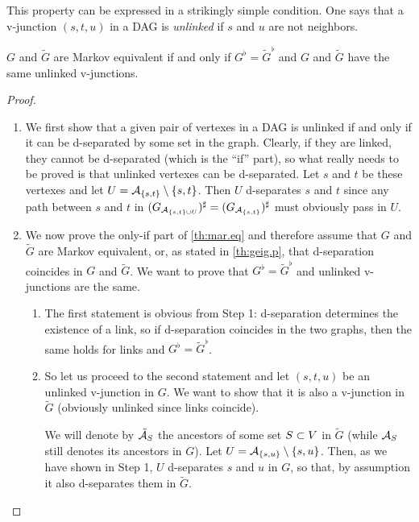 This property can be expressed in a strikingly simple
condition. One says that a v-junction $(s,t,u)$ in a DAG is {\em unlinked}
if $s$ and $u$ are not neighbors.   
\begin{theorem}
\label{th:mar.eq}
$G$ and $\tilde G$ are Markov equivalent if and only if $G^\flat =
\tilde G^\flat$ and $G$ and $\tilde G$ have the same unlinked v-junctions.
\end{theorem}
\begin{proof}

\begin{enumerate}[label={\it Step \arabic*.}]
\item
We first show that
a given pair of vertexes in a DAG is unlinked if and only if it can
be d-separated by some set in the graph. Clearly, if they are linked,
they cannot be d-separated (which is the ``if'' part), so what really needs to be proved is that
unlinked vertexes can be d-separated. Let $s$ and $t$ be these vertexes
and let $U = {\mathcal A}_{\{s,t\}}\setminus \{s,t\}$. Then $U$ d-separates $s$ and
$t$ since any path between $s$ and $t$ in $(G_{{\mathcal A}_{\{s,t\}\cup
U}})^\sharp = (G_{{\mathcal A}_{\{s,t\}}})^\sharp$ must obviously pass in $U$.

\item  We now prove the only-if part of 
\cref{th:mar.eq} and
therefore assume that $G$ and $\tilde G$ are Markov equivalent, or, as
stated in  \cref{th:geig.p}, that
d-separation coincides in $G$ and $\tilde G$. We want to prove that
$G^\flat = \tilde G^\flat$ and unlinked v-junctions are the same.

\begin{enumerate}[label={\it Step 2.\arabic*.}]
\item The first statement is obvious from Step 1: d-separation determines
the existence of a link, so if d-separation coincides in the two
graphs, then the same holds for  links and $G^\flat = \tilde G^\flat$. 

\item So let us proceed to the second statement and
let $(s,t,u)$ be an unlinked
v-junction in $G$. We want to show that it is also a v-junction in
$\tilde G$ (obviously unlinked since links coincide). 

We will denote by $\tilde {{\mathcal A}}_S$ the ancestors of some set $S\subset V$ in $\tilde G$ (while ${\mathcal A}_S$
still denotes its ancestors in $G$). Let  $U =
{\mathcal A}_{\{s,u\}}\setminus \{s,u\}$.  Then,
as we have shown in Step 1, $U$ d-separates $s$ and $u$ in $G$,
so that, by assumption it also d-separates  them in $\tilde G$. 


\end{enumerate}
\end{enumerate}
\end{proof}

